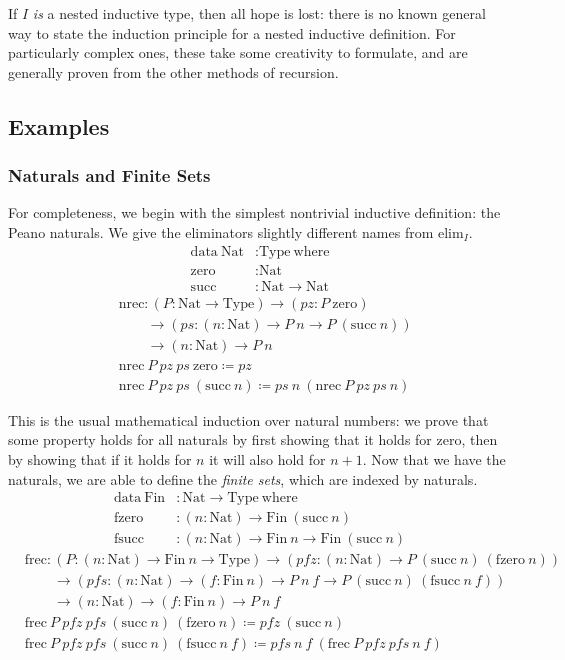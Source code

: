 \documentclass{report}
\newcommand{\Nat}{\const{Nat}}
\newcommand{\zero}{\const{zero}}
\renewcommand{\succ}{\const{succ}}
\newcommand{\Fin}{\const{Fin}}
\newcommand{\fzero}{\const{fzero}}
\newcommand{\fsucc}{\const{fsucc}}
\newcommand{\const}[1]{\text{#1}}
\newcommand{\data}{\const{data}}
\newcommand{\Type}{\const{Type}}
\newcommand{\where}{\const{where}}
\begin{document}
If $I$ \emph{is} a nested inductive type, then all hope is lost: there is no known general way to state the induction principle for a nested inductive definition. For particularly complex ones, these take some creativity to formulate, and are generally proven from the other methods of recursion.

\subsection{Examples}

\subsubsection{Naturals and Finite Sets}

For completeness, we begin with the simplest nontrivial inductive definition: the Peano naturals. We give the eliminators slightly different names from $\const{elim}_I$.
%
\begin{align*}
    \data ~ \Nat &: \Type ~ \where \\
    \zero &: \Nat \\
    \succ &: \Nat \to \Nat
\end{align*}
%
\begin{align*}
    &\const{nrec} : (P : \Nat \to \Type) \to (pz: P ~ \zero) \\
    &\qquad\to (ps: (n: \Nat) \to P ~ n \to P ~ (\succ ~ n)) \\
    &\qquad\to (n: \Nat) \to P ~ n \\
    &\const{nrec} ~ P ~ pz ~ ps ~ \zero \coloneqq pz \\
    &\const{nrec} ~ P ~ pz ~ ps ~ (\succ ~ n) \coloneqq ps ~ n ~ (\const{nrec} ~ P ~ pz ~ ps ~ n)
\end{align*}

This is the usual mathematical induction over natural numbers: we prove that some property holds for all naturals by first showing that it holds for zero, then by showing that if it holds for $n$ it will also hold for $n+1$. Now that we have the naturals, we are able to define the \emph{finite sets}, which are indexed by naturals.
%
\begin{align*}
    \data ~ \Fin &: \Nat \to \Type ~ \where \\
    \fzero &: (n: \Nat) \to \Fin ~ (\succ ~ n) \\
    \fsucc &: (n: \Nat) \to \Fin ~ n \to \Fin ~ (\succ ~ n)
\end{align*}
%
\begin{align*}
    &\const{frec} : (P : (n: \Nat) \to \Fin ~ n \to \Type) \to (pfz: (n: \Nat) \to P ~ (\succ ~ n) ~ (\fzero ~ n)) \\
    &\qquad\to (pfs: (n: \Nat) \to (f: \Fin ~ n) \to P ~ n ~ f \to P ~ (\succ ~ n) ~ (\fsucc ~ n ~ f)) \\
    &\qquad\to (n: \Nat) \to (f: \Fin ~ n) \to P ~ n ~ f \\
    &\const{frec} ~ P ~ pfz ~ pfs ~ (\succ ~ n) ~ (\fzero ~ n) \coloneqq pfz ~ (\succ ~ n) \\
    &\const{frec} ~ P ~ pfz ~ pfs ~ (\succ ~ n) ~ (\fsucc ~ n ~ f) \coloneqq pfs ~ n ~ f ~ (\const{frec} ~ P ~ pfz ~ pfs ~ n ~ f)
\end{align*}
\end{document}
